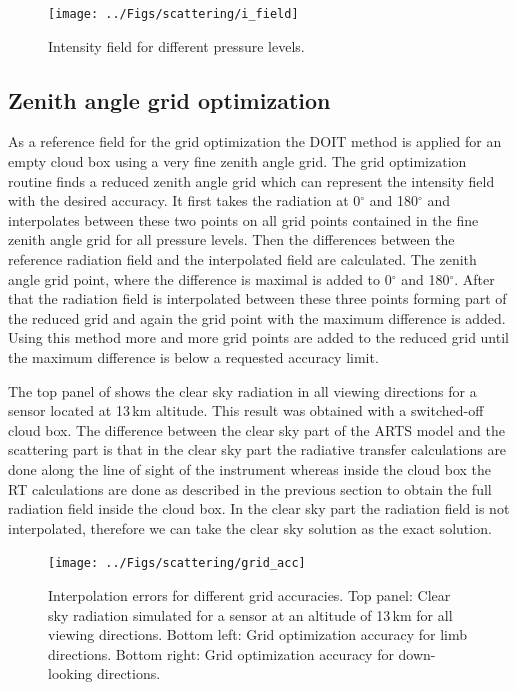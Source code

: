 \begin{figure}[htbp]
\centering
  \texttt{[image: ../Figs/scattering/i\_field]}
  \caption{Intensity field for different pressure levels.}
  \label{fig:scattering:i_field}  
\end{figure}


\subsection{Zenith angle grid optimization}

As a reference field for the grid optimization the DOIT method is
applied for an empty cloud box using a very fine zenith angle grid. The
grid optimization routine finds a reduced zenith angle grid which can
represent the intensity field with the desired accuracy.  It first
takes the radiation at 0$^\circ$ and 180$^\circ$ and interpolates
between these two points on all grid points contained in the fine
zenith angle grid for all pressure levels. Then the differences
between the reference radiation field and the interpolated field are
calculated. The zenith angle grid point, where the difference is
maximal is added to 0$^\circ$ and 180$^\circ$. After that the
radiation field is interpolated between these three points forming 
part of the reduced grid and again the grid point with the maximum
difference is added. Using this method more and more grid points are
added to the reduced grid until the maximum difference is below a
requested accuracy limit.

The top panel of  shows the clear sky
radiation in all viewing directions for a sensor located at 13\,km
altitude. This result was obtained with a switched-off cloud box.  The
difference between the clear sky part of the ARTS model and the
scattering part is that in the clear sky part the radiative transfer
calculations are done along the line of sight of the instrument
whereas inside the cloud box the RT calculations are done as described
in the previous section to obtain the full radiation field inside the
cloud box. In the clear sky part the radiation field is not
interpolated, therefore we can take the clear sky solution as the exact
solution.

\begin{figure}[t]
\centering
  \texttt{[image: ../Figs/scattering/grid\_acc]}
  \caption{Interpolation errors for different grid accuracies.
    Top panel: Clear sky radiation simulated for a sensor at an altitude of
    13\,km for all viewing directions.
    Bottom left: Grid optimization accuracy for limb directions.
    Bottom right: Grid optimization accuracy for down-looking
    directions.}
  \label{fig:scattering:grid_acc}  
\end{figure}

